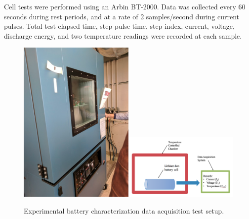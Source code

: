 \documentclass[]{aiaa-tc}%
\begin{document}
Cell tests were performed using an Arbin BT-2000. Data was collected every 60 seconds during rest periods, and at a rate of 2 samples/second during current pulses. Total test elapsed time, step pulse time, step index, current, voltage, discharge energy, and two temperature readings were recorded at each sample. 

\begin{figure}[!htb]%
	\centering
	\includegraphics[width=0.5\textwidth]{figures/chamber.png}\includegraphics[width=0.5\textwidth]{figures/experiment_diagram.png}
	\caption{Experimental battery characterization data acquisition test setup.}
	\label{fig:exp}
\end{figure}
\end{document}
